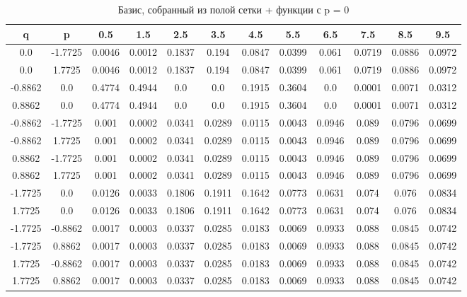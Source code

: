 \documentclass[a4paper,14pt]{extarticle}
\begin{document}
\begin{landscape}
\begin{table}[H]
\centering
\caption{Базис, собранный из полой сетки + функции с p = 0}
\begin{tabular}{|c|c|*{10}{c}|}
\hline
q       & p       & 0.5    & 1.5    & 2.5    & 3.5    & 4.5    & 5.5    & 6.5    & 7.5    & 8.5    & 9.5    \\ 
\hline                                                                                                      
0.0     & -1.7725 & 0.0046 & 0.0012 & 0.1837 & 0.194  & 0.0847 & 0.0399 & 0.061  & 0.0719 & 0.0886 & 0.0972 \\  
0.0     & 1.7725  & 0.0046 & 0.0012 & 0.1837 & 0.194  & 0.0847 & 0.0399 & 0.061  & 0.0719 & 0.0886 & 0.0972 \\  
-0.8862 & 0.0     & 0.4774 & 0.4944 & 0.0    & 0.0    & 0.1915 & 0.3604 & 0.0    & 0.0001 & 0.0071 & 0.0312 \\  
0.8862  & 0.0     & 0.4774 & 0.4944 & 0.0    & 0.0    & 0.1915 & 0.3604 & 0.0    & 0.0001 & 0.0071 & 0.0312 \\  
-0.8862 & -1.7725 & 0.001  & 0.0002 & 0.0341 & 0.0289 & 0.0115 & 0.0043 & 0.0946 & 0.089  & 0.0796 & 0.0699 \\  
-0.8862 & 1.7725  & 0.001  & 0.0002 & 0.0341 & 0.0289 & 0.0115 & 0.0043 & 0.0946 & 0.089  & 0.0796 & 0.0699 \\  
0.8862  & -1.7725 & 0.001  & 0.0002 & 0.0341 & 0.0289 & 0.0115 & 0.0043 & 0.0946 & 0.089  & 0.0796 & 0.0699 \\  
0.8862  & 1.7725  & 0.001  & 0.0002 & 0.0341 & 0.0289 & 0.0115 & 0.0043 & 0.0946 & 0.089  & 0.0796 & 0.0699 \\  
-1.7725 & 0.0     & 0.0126 & 0.0033 & 0.1806 & 0.1911 & 0.1642 & 0.0773 & 0.0631 & 0.074  & 0.076  & 0.0834 \\  
1.7725  & 0.0     & 0.0126 & 0.0033 & 0.1806 & 0.1911 & 0.1642 & 0.0773 & 0.0631 & 0.074  & 0.076  & 0.0834 \\  
-1.7725 & -0.8862 & 0.0017 & 0.0003 & 0.0337 & 0.0285 & 0.0183 & 0.0069 & 0.0933 & 0.088  & 0.0845 & 0.0742 \\  
-1.7725 & 0.8862  & 0.0017 & 0.0003 & 0.0337 & 0.0285 & 0.0183 & 0.0069 & 0.0933 & 0.088  & 0.0845 & 0.0742 \\  
1.7725  & -0.8862 & 0.0017 & 0.0003 & 0.0337 & 0.0285 & 0.0183 & 0.0069 & 0.0933 & 0.088  & 0.0845 & 0.0742 \\  
1.7725  & 0.8862  & 0.0017 & 0.0003 & 0.0337 & 0.0285 & 0.0183 & 0.0069 & 0.0933 & 0.088  & 0.0845 & 0.0742 \\  
\hline
\end{tabular}
\end{table} 


\end{landscape}
\end{document}
